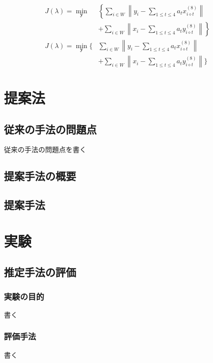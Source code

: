 \documentclass[dvipdfmx,report,disablejfam,nosetpagesize,12pt]{jsbook}
\begin{document}
\begin{align}
   J(\lambda) = \min_{\bm y}
   & \left\{
      \sum_{i\in W} \left\| y_i - \sum_{1\le t \le 4} a_t x_{i\diamond t}^{(8)} \right\|
   \right. \nonumber \\
   & \left.
      + \sum_{i\in W} \left\| x_i - \sum_{1\le t \le 4} a_t y_{i\diamond t}^{(8)} \right\|
   \right\}
   \\
   J(\lambda) = \min_{\bm y}
   \Biggl\{
   &   \sum_{i\in W} \left\| y_i - \sum_{1\le t \le 4} a_t x_{i\diamond t}^{(8)} \right\|
   \nonumber \\
   &   + \sum_{i\in W} \left\| x_i - \sum_{1\le t \le 4} a_t y_{i\diamond t}^{(8)} \right\|
   \Biggr\}
\end{align}



\chapter{提案法} \label{Chap.proposed}
\section{従来の手法の問題点} \label{Sec.problem}
従来の手法の問題点を書く

\section{提案手法の概要}
\section{提案手法}

\chapter{実験}
\section{推定手法の評価}
\subsection{実験の目的}
書く
\subsection{評価手法}
書く
\end{document}
